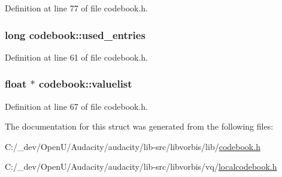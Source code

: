 Definition at line 77 of file codebook.\+h.

\subsubsection[{\texorpdfstring{used\+\_\+entries}{used_entries}}]{\setlength{\rightskip}{0pt plus 5cm}long codebook\+::used\+\_\+entries}\hypertarget{structcodebook_a4ab1a61278a77046c0a213b7ddfe748c}{}\label{structcodebook_a4ab1a61278a77046c0a213b7ddfe748c}


Definition at line 61 of file codebook.\+h.

\subsubsection[{\texorpdfstring{valuelist}{valuelist}}]{\setlength{\rightskip}{0pt plus 5cm}float $\ast$ codebook\+::valuelist}\hypertarget{structcodebook_ac3365da931532e158435f2e62021c90b}{}\label{structcodebook_ac3365da931532e158435f2e62021c90b}


Definition at line 67 of file codebook.\+h.



The documentation for this struct was generated from the following files\+:\begin{DoxyCompactItemize}
\item 
C\+:/\+\_\+dev/\+Open\+U/\+Audacity/audacity/lib-\/src/libvorbis/lib/\hyperlink{codebook_8h}{codebook.\+h}\item 
C\+:/\+\_\+dev/\+Open\+U/\+Audacity/audacity/lib-\/src/libvorbis/vq/\hyperlink{localcodebook_8h}{localcodebook.\+h}\end{DoxyCompactItemize}

